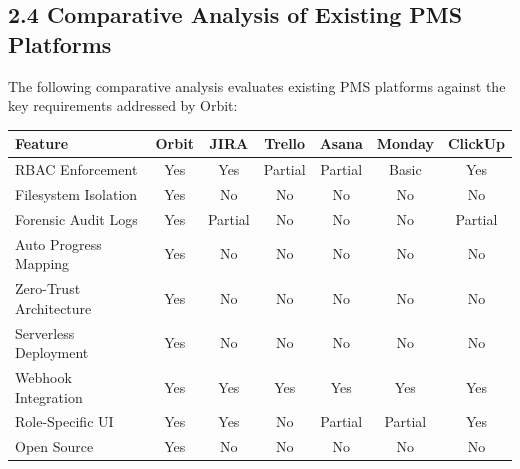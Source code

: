 ﻿\documentclass[12pt]{article}
\begin{document}
\subsection*{2.4 Comparative Analysis of Existing PMS Platforms}
The following comparative analysis evaluates existing PMS platforms against the key requirements addressed by Orbit:

\begin{center}
\begin{tabular}{|l|c|c|c|c|c|c|}
\hline
\textbf{Feature} & \textbf{Orbit} & \textbf{JIRA} & \textbf{Trello} & \textbf{Asana} & \textbf{Monday} & \textbf{ClickUp} \\ \hline
RBAC Enforcement & Yes & Yes & Partial & Partial & Basic & Yes \\ \hline
Filesystem Isolation & Yes & No & No & No & No & No \\ \hline
Forensic Audit Logs & Yes & Partial & No & No & No & Partial \\ \hline
Auto Progress Mapping & Yes & No & No & No & No & No \\ \hline
Zero-Trust Architecture & Yes & No & No & No & No & No \\ \hline
Serverless Deployment & Yes & No & No & No & No & No \\ \hline
Webhook Integration & Yes & Yes & Yes & Yes & Yes & Yes \\ \hline
Role-Specific UI & Yes & Yes & No & Partial & Partial & Yes \\ \hline
Open Source & Yes & No & No & No & No & No \\ \hline
\end{tabular}
\end{center}
\end{document}
